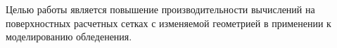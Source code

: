 Целью работы является повышение производительности вычислений на поверхностных расчетных сетках с изменяемой геометрией в применении к моделированию обледенения.